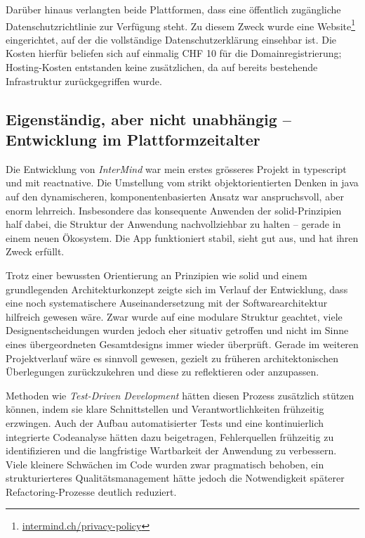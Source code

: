 Darüber hinaus verlangten beide Plattformen, dass eine öffentlich zugängliche Datenschutzrichtlinie zur Verfügung steht. Zu diesem Zweck wurde eine Website\footnote{\href{https://intermind.ch/privacy-policy.html?lang=de}{intermind.ch/privacy-policy}} eingerichtet, auf der die vollständige Datenschutzerklärung einsehbar ist. Die Kosten hierfür beliefen sich auf einmalig CHF 10 für die Domainregistrierung; Hosting-Kosten entstanden keine zusätzlichen, da auf bereits bestehende Infrastruktur zurückgegriffen wurde.

\subsection{Eigenständig, aber nicht unabhängig – Entwicklung im Plattformzeitalter}

Die Entwicklung von \textit{InterMind} war mein erstes grösseres Projekt in \gls{typescript} und mit \gls{reactnative}. Die Umstellung vom strikt objektorientierten Denken in \gls{java} auf den dynamischeren, komponentenbasierten Ansatz war anspruchsvoll, aber enorm lehrreich. Insbesondere das konsequente Anwenden der \gls{solid}-Prinzipien half dabei, die Struktur der Anwendung nachvollziehbar zu halten – gerade in einem neuen Ökosystem. Die App funktioniert stabil, sieht gut aus, und hat ihren Zweck erfüllt.

Trotz einer bewussten Orientierung an Prinzipien wie \gls{solid} und einem grundlegenden Architekturkonzept zeigte sich im Verlauf der Entwicklung, dass eine noch systematischere Auseinandersetzung mit der Softwarearchitektur hilfreich gewesen wäre. Zwar wurde auf eine modulare Struktur geachtet, viele Designentscheidungen wurden jedoch eher situativ getroffen und nicht im Sinne eines übergeordneten Gesamtdesigns immer wieder überprüft. Gerade im weiteren Projektverlauf wäre es sinnvoll gewesen, gezielt zu früheren architektonischen Überlegungen zurückzukehren und diese zu reflektieren oder anzupassen.

Methoden wie \emph{Test-Driven Development} hätten diesen Prozess zusätzlich stützen können, indem sie klare Schnittstellen und Verantwortlichkeiten frühzeitig erzwingen. Auch der Aufbau automatisierter Tests und eine kontinuierlich integrierte Codeanalyse hätten dazu beigetragen, Fehlerquellen frühzeitig zu identifizieren und die langfristige Wartbarkeit der Anwendung zu verbessern. Viele kleinere Schwächen im Code wurden zwar pragmatisch behoben, ein strukturierteres Qualitätsmanagement hätte jedoch die Notwendigkeit späterer Refactoring-Prozesse deutlich reduziert.

